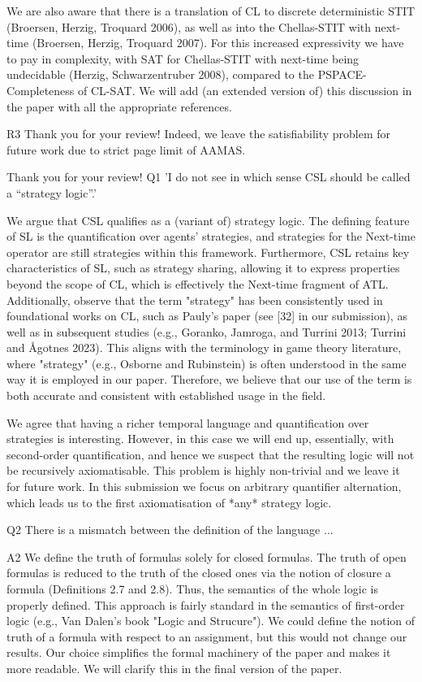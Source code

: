 We are also aware that there is a translation of CL to discrete deterministic STIT (Broersen, Herzig, Troquard 2006), as well as into the Chellas-STIT with next-time (Broersen, Herzig, Troquard 2007). For this increased expressivity we have to pay in complexity, with SAT for Chellas-STIT with next-time being undecidable (Herzig, Schwarzentruber 2008), compared to the PSPACE-Completeness of CL-SAT. We will add (an extended version of) this discussion in the paper with all the appropriate references. 

R3 Thank you for your review! Indeed, we leave the satisfiability problem for future work due to strict page limit of AAMAS. 





Thank you for your review!
Q1 'I do not see in which sense CSL should be called a “strategy logic”.'

We argue that CSL qualifies as a (variant of) strategy logic. The defining feature of SL is the quantification over agents' strategies, and strategies for the Next-time operator are still strategies within this framework. Furthermore, CSL retains key characteristics of SL, such as strategy sharing, allowing it to express properties beyond the scope of CL, which is effectively the Next-time fragment of ATL. Additionally, observe that the term "strategy" has been consistently used in foundational works on CL, such as Pauly's paper (see [32] in our submission), as well as in subsequent studies (e.g., Goranko, Jamroga, and Turrini 2013; Turrini and Ågotnes 2023). This aligns with the terminology in game theory literature, where "strategy" (e.g., Osborne and Rubinstein) is often understood in the same way it is employed in our paper. Therefore, we believe that our use of the term is both accurate and consistent with established usage in the field.

We agree that having a richer temporal language and quantification over strategies is interesting. However, in this case we will end up, essentially, with second-order quantification, and hence we suspect that the resulting logic will not be recursively axiomatisable. This problem is highly non-trivial and we leave it for future work. In this submission we focus on arbitrary quantifier alternation, which leads us to the first axiomatisation of *any* strategy logic. 

Q2 There is a mismatch between the definition of the language ...

A2 We define the truth of formulas solely for closed formulas. The truth of open formulas is reduced to the truth of the closed ones via the notion of closure a formula (Definitions 2.7 and 2.8). Thus, the semantics of the whole logic is properly defined.  This approach is fairly standard in the semantics of first-order logic (e.g., Van Dalen's book "Logic and Strucure"). We could define the notion of truth of a formula with respect to an assignment, but this would not change our results. Our choice simplifies the formal machinery of the paper and makes it more readable.  We will clarify this in the final version of the paper.

